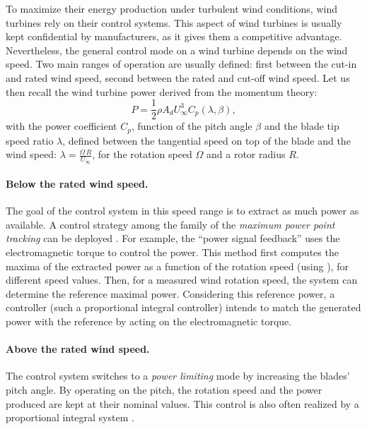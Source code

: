 To maximize their energy production under turbulent wind conditions, wind turbines rely on their control systems. 
This aspect of wind turbines is usually kept confidential by manufacturers, as it gives them a competitive advantage.  
Nevertheless, the general control mode on a wind turbine depends on the wind speed. 
Two main ranges of operation are usually defined: first between the cut-in and rated wind speed, second between the rated and cut-off wind speed. 
Let us then recall the wind turbine power derived from the momentum theory: 
\begin{equation}
    P = \frac12 \rho A_d U_\infty^3 C_p(\lambda, \beta), 
    \label{eq:power_wt}
\end{equation}
with the power coefficient $C_p$, function of the pitch angle $\beta$ and the blade tip speed ratio $\lambda$, defined between the tangential speed on top of the blade and the wind speed: $\lambda = \frac{\Omega \, R}{U_\infty}$, for the rotation speed $\Omega$ and a rotor radius $R$. 

\paragraph{Below the rated wind speed.}
The goal of the control system in this speed range is to extract as much power as available. 
A control strategy among the family of the \textit{maximum power point tracking} can be deployed \citep{abdullah_2012_control_review}.   
For example, the ``power signal feedback'' uses the electromagnetic torque to control the power. 
This method first computes the maxima of the extracted power as a function of the rotation speed (using ), for different speed values. 
Then, for a measured wind rotation speed, the system can determine the reference maximal power. 
Considering this reference power, a controller (such a proportional integral controller) intends to match the generated power with the reference by acting on the electromagnetic torque. 


\paragraph{Above the rated wind speed.}
The control system switches to a \textit{power limiting} mode by increasing the blades' pitch angle. 
By operating on the pitch, the rotation speed and the power produced are kept at their nominal values. 
This control is also often realized by a proportional integral system \citep{bossanyi_2003_pitch_control}. 

